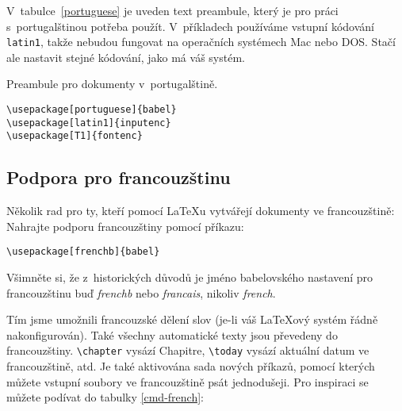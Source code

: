 V~tabulce~\ref{portuguese} je uveden text preambule, který je 
pro práci s~portugalštinou potřeba použít. V~příkladech používáme vstupní kódování
\texttt{latin1}, takže nebudou fungovat na operačních systémech Mac nebo DOS.
Stačí ale nastavit stejné kódování, jako má váš systém.

\begin{table}[!bth]
\caption{Preambule pro dokumenty v~portugalštině.} \label{portuguese}
\begin{lined}{6.5cm}
\begin{verbatim}
\usepackage[portuguese]{babel}
\usepackage[latin1]{inputenc}
\usepackage[T1]{fontenc}
\end{verbatim}

\bigskip
\end{lined}
\end{table}

\subsection{Podpora pro francouzštinu}

Několik rad pro ty, kteří pomocí \LaTeX u vytvářejí dokumenty ve
francouzštině: Nahrajte podporu francouzštiny pomocí příkazu:

\begin{lscommand}
\verb|\usepackage[frenchb]{babel}|
\end{lscommand}

Všimněte si, že z~historických důvodů je jméno \textsf{babel}ovského
nastavení pro francouzštinu buď \emph{frenchb} nebo \emph{francais},
nikoliv \emph{french}.

Tím jsme umožnili francouzské dělení slov (je-li váš \LaTeX ový systém
řádně nakonfigurován). Také všechny automatické texty jsou převedeny
do francouzštiny. \verb+\chapter+ vysází Chapitre, \verb+\today+
vysází aktuální datum ve francouzštině, atd. Je také aktivována sada
nových příkazů, pomocí kterých můžete vstupní soubory ve francouzštině
psát jednodušeji. Pro inspiraci se můžete podívat do tabulky
\ref{cmd-french}:

